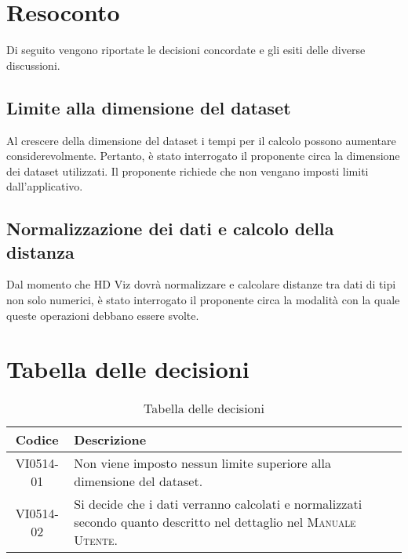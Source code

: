 \documentclass{article}
\begin{document}
\section{Resoconto}
\label{sec:resoconto}

Di seguito vengono riportate le decisioni concordate e gli esiti delle diverse discussioni.

\subsection{Limite alla dimensione del dataset}
\label{itm:1}

Al crescere della dimensione del dataset i tempi per il calcolo possono aumentare considerevolmente. Pertanto, è stato interrogato il proponente circa la dimensione dei dataset utilizzati. Il proponente richiede che non vengano imposti limiti dall'applicativo.

\subsection{Normalizzazione dei dati e calcolo della distanza}
\label{itm:2}
Dal momento che HD Viz dovrà normalizzare e calcolare distanze tra dati di tipi non solo numerici, è stato interrogato il proponente circa la modalità con la quale queste operazioni debbano essere svolte.


\section{Tabella delle decisioni}%
\label{sub:decisioni}

\begin{table}[!ht]
	\centering
	\begin{tabular}{|c|p{13cm}|}
		\hline
		\rowcolor{lightgray}
		\textbf{Codice} & \textbf{Descrizione} \\
		\hline
			VI0514-01 & Non viene imposto nessun limite superiore alla dimensione del dataset. \\
            VI0514-02 & Si decide che i dati verranno calcolati e normalizzati secondo quanto descritto nel dettaglio nel \textsc{Manuale Utente}. \\
		\hline
	\end{tabular}
	\caption{Tabella delle decisioni}
\end{table}
\end{document}
